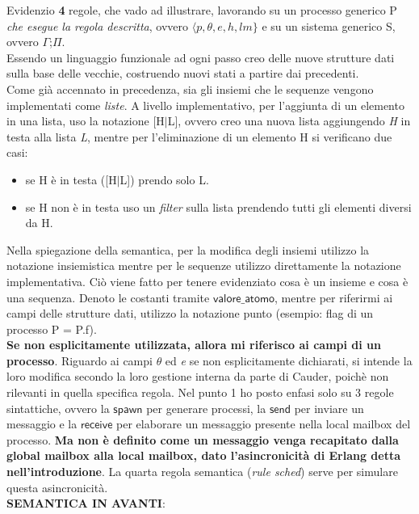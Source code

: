 \documentclass[background.tex]{subfiles}
\begin{document}
Evidenzio \textbf{4} regole, che vado ad illustrare, lavorando su un processo generico P \textit{che esegue la regola descritta}, ovvero $\displaystyle \langle p,\theta,e,h,lm\}$ e su un sistema generico S, ovvero $\Gamma$;$\Pi$.\\
Essendo un linguaggio funzionale ad ogni passo creo delle nuove strutture dati sulla base delle vecchie, costruendo nuovi stati a partire dai precedenti.\\
Come già accennato in precedenza, sia gli insiemi che le sequenze vengono implementati come \textit{liste}. A livello implementativo, per l'aggiunta di un elemento in una lista, uso la notazione [H$\mid$L], ovvero creo una nuova lista aggiungendo \textit{H} in testa alla lista \textit{L}, mentre per l'eliminazione di un elemento H si verificano due casi:
	\begin{itemize}
		\item se H è in testa ([H$\mid$L]) prendo solo L.
		\item se H non è in testa uso un \textit{filter} sulla lista prendendo tutti gli elementi diversi da H.
	\end{itemize}
Nella spiegazione della semantica, per la modifica degli insiemi utilizzo la notazione insiemistica mentre per le sequenze utilizzo direttamente la notazione implementativa.
Ciò viene fatto per tenere evidenziato cosa è un insieme e cosa è una sequenza.
Denoto le costanti tramite $\mathsf{valore\_atomo}$, mentre per riferirmi ai campi delle strutture dati, utilizzo la notazione punto (esempio: flag di un processo P = P.f).\\
\textbf{Se non esplicitamente utilizzata, allora mi riferisco ai campi di un processo}.
Riguardo ai campi $\theta$ ed \textit{e} se non esplicitamente dichiarati, si intende la loro modifica secondo la loro gestione interna da parte di Cauder, poichè non rilevanti in quella specifica regola.
Nel punto 1 ho posto enfasi solo su 3 regole sintattiche, ovvero la $\mathsf{spawn}$ per generare processi, la $\mathsf{send}$ per inviare un messaggio e la $\mathsf{receive}$ per elaborare un messaggio presente nella local mailbox del processo.
\textbf{Ma non è definito come un messaggio venga recapitato dalla global mailbox alla local mailbox, dato l'asincronicità di Erlang detta nell'introduzione}. La quarta regola semantica (\textit{rule sched}) serve per simulare questa asincronicità.\\
\textbf{SEMANTICA IN AVANTI}:
\end{document}
